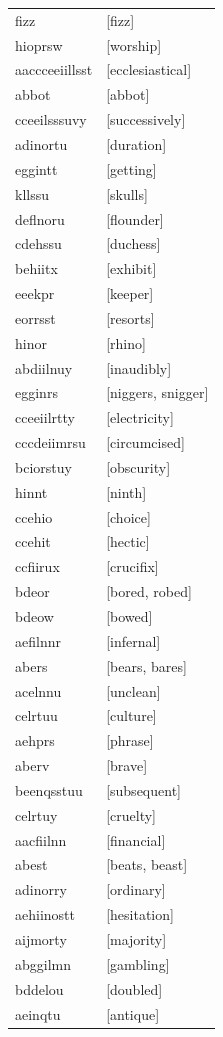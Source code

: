 \documentclass{article}
\begin{document}
\begin{tabular}{ll}
fizz & [fizz] \\
hioprsw & [worship] \\
aaccceeiillsst & [ecclesiastical] \\
abbot & [abbot] \\
cceeilsssuvy & [successively] \\
adinortu & [duration] \\
eggintt & [getting] \\
kllssu & [skulls] \\
deflnoru & [flounder] \\
cdehssu & [duchess] \\
behiitx & [exhibit] \\
eeekpr & [keeper] \\
eorrsst & [resorts] \\
hinor & [rhino] \\
abdiilnuy & [inaudibly] \\
egginrs & [niggers, snigger] \\
cceeiilrtty & [electricity] \\
cccdeiimrsu & [circumcised] \\
bciorstuy & [obscurity] \\
hinnt & [ninth] \\
ccehio & [choice] \\
ccehit & [hectic] \\
ccfiirux & [crucifix] \\
bdeor & [bored, robed] \\
bdeow & [bowed] \\
aefilnnr & [infernal] \\
abers & [bears, bares] \\
acelnnu & [unclean] \\
celrtuu & [culture] \\
aehprs & [phrase] \\
aberv & [brave] \\
beenqsstuu & [subsequent] \\
celrtuy & [cruelty] \\
aacfiilnn & [financial] \\
abest & [beats, beast] \\
adinorry & [ordinary] \\
aehiinostt & [hesitation] \\
aijmorty & [majority] \\
abggilmn & [gambling] \\
bddelou & [doubled] \\
aeinqtu & [antique] \\

\end{tabular}
\end{document}
